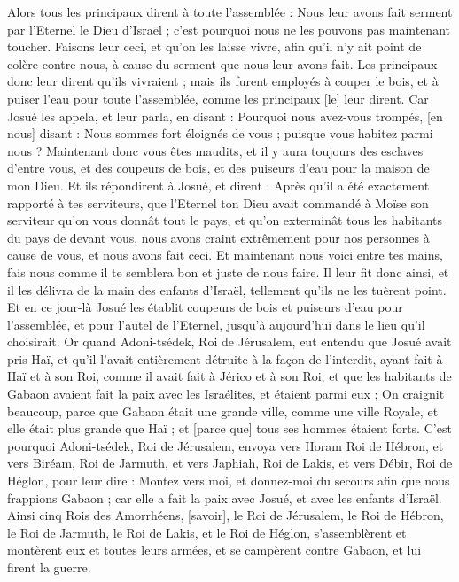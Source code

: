 \begin{multicols}{2}
Alors tous les principaux dirent à toute l'assemblée : Nous leur avons fait serment par l'Eternel le Dieu d'Israël ; c'est pourquoi nous ne les pouvons pas maintenant toucher.
Faisons leur ceci, et qu'on les laisse vivre, afin qu'il n'y ait point de colère contre nous, à cause du serment que nous leur avons fait.
Les principaux donc leur dirent qu'ils vivraient ; mais ils furent employés à couper le bois, et à puiser l'eau pour toute l'assemblée, comme les principaux [le] leur dirent.
Car Josué les appela, et leur parla, en disant : Pourquoi nous avez-vous trompés, [en nous] disant : Nous sommes fort éloignés de vous ; puisque vous habitez parmi nous ?
Maintenant donc vous êtes maudits, et il y aura toujours des esclaves d'entre vous, et des coupeurs de bois, et des puiseurs d'eau pour la maison de mon Dieu.
Et ils répondirent à Josué, et dirent : Après qu'il a été exactement rapporté à tes serviteurs, que l'Eternel ton Dieu avait commandé à Moïse son serviteur qu'on vous donnât tout le pays, et qu'on exterminât tous les habitants du pays de devant vous, nous avons craint extrêmement pour nos personnes à cause de vous, et nous avons fait ceci.
Et maintenant nous voici entre tes mains, fais nous comme il te semblera bon et juste de nous faire.
Il leur fit donc ainsi, et il les délivra de la main des enfants d'Israël, tellement qu'ils ne les tuèrent point.
Et en ce jour-là Josué les établit coupeurs de bois et puiseurs d'eau pour l'assemblée, et pour l'autel de l'Eternel, jusqu'à aujourd'hui dans le lieu qu'il choisirait.
\VerseOne{}Or quand Adoni-tsédek, Roi de Jérusalem, eut entendu que Josué avait pris Haï, et qu'il l'avait entièrement détruite à la façon de l'interdit, ayant fait à Haï et à son Roi, comme il avait fait à Jérico et à son Roi, et que les habitants de Gabaon avaient fait la paix avec les Israélites, et étaient parmi eux ;
On craignit beaucoup, parce que Gabaon était une grande ville, comme une ville Royale, et elle était plus grande que Haï ; et [parce que] tous ses hommes étaient forts.
C'est pourquoi Adoni-tsédek, Roi de Jérusalem, envoya vers Horam Roi de Hébron, et vers Biréam, Roi de Jarmuth, et vers Japhiah, Roi de Lakis, et vers Débir, Roi de Héglon, pour leur dire :
Montez vers moi, et donnez-moi du secours afin que nous frappions Gabaon ; car elle a fait la paix avec Josué, et avec les enfants d'Israël.
Ainsi cinq Rois des Amorrhéens, [savoir], le Roi de Jérusalem, le Roi de Hébron, le Roi de Jarmuth, le Roi de Lakis, et le Roi de Héglon, s'assemblèrent et montèrent eux et toutes leurs armées, et se campèrent contre Gabaon, et lui firent la guerre.

\end{multicols}
